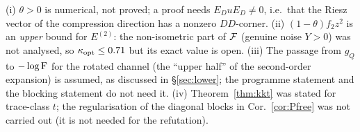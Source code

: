\documentclass[11pt]{article}
\begin{document}
\begin{verdictgap}
(i) $\theta>0$ is numerical, not proved; a proof needs
$E_DuE_D\ne0$, i.e.\ that the Riesz vector of the compression direction has a nonzero
$DD$-corner.  (ii) $(1-\theta)f_2z^2$ is an \emph{upper} bound for $E^{(2)}$: the
non-isometric part of $\mathcal F$ (genuine noise $Y>0$) was not analysed, so
$\kappa_{\rm opt}\le0.71$ but its exact value is open.  (iii) The passage from
$g_Q$ to $-\log\operatorname{F}$ for the rotated channel (the ``upper half'' of the second-order
expansion) is assumed, as discussed in \S\ref{sec:lower}; the programme statement and
the blocking statement do not need it.  (iv) Theorem~\ref{thm:kkt} was stated for
trace-class $t$; the regularisation of the diagonal blocks in Cor.~\ref{cor:Pfree} was
not carried out (it is not needed for the refutation).
\end{verdictgap}
\end{document}
